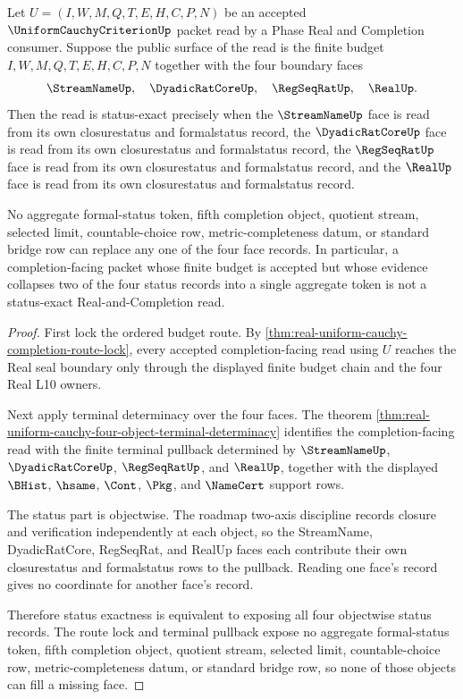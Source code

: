 \begin{theorem}
\label{thm:real-uniform-cauchy-four-face-status-exactness}
Let $U=(I,W,M,Q,T,E,H,C,P,N)$ be an accepted
$\UniformCauchyCriterionUp$ packet read by a Phase Real and Completion
consumer. Suppose the public surface of the read is the finite budget
$I,W,M,Q,T,E,H,C,P,N$ together with the four boundary faces
$$
\StreamNameUp,\quad \DyadicRatCoreUp,\quad \RegSeqRatUp,\quad \RealUp.
$$
Then the read is status-exact precisely when the $\StreamNameUp$ face is read
from its own closurestatus and formalstatus record, the $\DyadicRatCoreUp$
face is read from its own closurestatus and formalstatus record, the
$\RegSeqRatUp$ face is read from its own closurestatus and formalstatus
record, and the $\RealUp$ face is read from its own closurestatus and
formalstatus record.

No aggregate formal-status token, fifth completion object, quotient stream,
selected limit, countable-choice row, metric-completeness datum, or standard
bridge row can replace any one of the four face records. In particular, a
completion-facing packet whose finite budget is accepted but whose evidence
collapses two of the four status records into a single aggregate token is not a
status-exact Real-and-Completion read.
\end{theorem}
\begin{proof}
First lock the ordered budget route. By
\autoref{thm:real-uniform-cauchy-completion-route-lock}, every accepted
completion-facing read using $U$ reaches the Real seal boundary only through
the displayed finite budget chain and the four Real L10 owners.

Next apply terminal determinacy over the four faces. The theorem
\autoref{thm:real-uniform-cauchy-four-object-terminal-determinacy} identifies
the completion-facing read with the finite terminal pullback determined by
$\StreamNameUp$, $\DyadicRatCoreUp$, $\RegSeqRatUp$, and $\RealUp$, together
with the displayed $\BHist$, $\hsame$, $\Cont$, $\Pkg$, and $\NameCert$
support rows.

The status part is objectwise. The roadmap two-axis discipline records closure
and verification independently at each object, so the StreamName, DyadicRatCore,
RegSeqRat, and RealUp faces each contribute their own closurestatus and
formalstatus rows to the pullback. Reading one face's record gives no
coordinate for another face's record.

Therefore status exactness is equivalent to exposing all four objectwise status
records. The route lock and terminal pullback expose no aggregate formal-status
token, fifth completion object, quotient stream, selected limit,
countable-choice row, metric-completeness datum, or standard bridge row, so
none of those objects can fill a missing face.
\end{proof}

